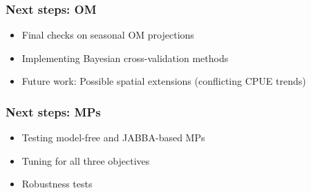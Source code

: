 \documentclass{beamer}
\begin{document}
\begin{frame}
    \frametitle{Next steps: OM}
\begin{itemize}
    \item Final checks on seasonal OM projections
    \item Implementing Bayesian cross-validation methods
    \item Future work: Possible spatial extensions (conflicting CPUE trends)
\end{itemize}
\end{frame}

\begin{frame}
    \frametitle{Next steps: MPs}
\begin{itemize}
    \item Testing model-free and JABBA-based MPs
    \item Tuning for all three objectives
    \item Robustness tests
\end{itemize}
\end{frame}

\end{document}
